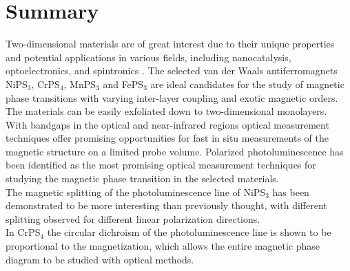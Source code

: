 \documentclass[
	oneside,
	parskip=half,
	a4paper,
]{scrbook}
\begin{document}
\cleardoublepage
\section*{Summary}
Two-dimensional materials are of great interest due to their unique properties and potential applications in various fields, including nanocatalysis, optoelectronics, and spintronics \cite{MPX_review}. 
The selected van der Waals antiferromagnets NiPS$_3$, CrPS$_4$, MnPS$_3$ and FePS$_3$ are ideal candidates for the study of magnetic phase transitions with varying inter-layer coupling and exotic magnetic orders.
The materials can be easily exfoliated down to two-dimensional monolayers.\\
With bandgaps in the optical and near-infrared regions optical measurement techniques offer promising opportunities for fast in situ measurements of the magnetic structure on a limited probe volume.
Polarized photoluminescence has been identified as the most promising optical measurement techniques for studying the magnetic phase transition in the selected materials.\\
The magnetic splitting of the photoluminescence line of NiPS$_3$ has been demonstrated to be more interesting than previously thought, with different splitting observed for different linear polarization directions.\\
In CrPS$_4$ the circular dichroism of the photoluminescence line is shown to be proportional to the magnetization, which allows the entire magnetic phase diagram to be studied with optical methods.

\vfill
\end{document}
